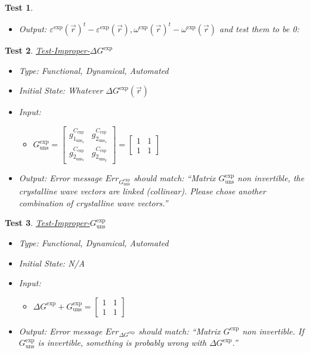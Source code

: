 \documentclass[12pt, titlepage]{article}
\newtheorem{Test}{Test}
\begin{document}
\begin{Test}
\begin{itemize}
\item Output:  ${\varepsilon^{\text{exp}}(\vec{r})}^{t}-\varepsilon^{\text{exp}}(\vec{r}), {\omega^{\text{exp}}(\vec{r})}^{t}- \omega^{\text{exp}}(\vec{r})$  and test them to be 0:
\end{itemize}
\end{Test}

\begin{Test}\normalfont\underline{Test-Improper-$\Delta G^{\text{exp}}$}
\label{T_Bad-G_ref}
\begin{itemize}
\item Type: Functional, Dynamical, Automated
\item Initial State: Whatever $\Delta G^{\text{exp}}(\vec{r})$
\item Input:
\begin{itemize}
	\item $G_{\text{uns}}^{\text{exp}} =
	\begin{bmatrix}
	g_{1_{{\text{uns}}_x}}^{C_{\text{exp}}} & g_{2_{{\text{uns}}_x}}^{C_{\text{exp}}} \\
	g_{2_{{\text{uns}}_x}}^{C_{\text{exp}}} & g_{2_{{\text{uns}}_y}}^{C_{\text{exp}}} 
	\end{bmatrix} =\begin{bmatrix}
	1 & 1 \\
	1 & 1 
	\end{bmatrix} $
	\end{itemize} 
\item Output:
Error message $Err_{G_{\text{uns}}^{\text{exp}}}$ should match:
\enquote{Matrix $G_{\text{uns}}^{\text{exp}}$ non invertible, the
  crystalline wave vectors are linked (collinear). Please chose
   another combination of crystalline wave vectors.}
\end{itemize}
\end{Test}

\begin{Test}\normalfont\underline{Test-Improper-$G_{\text{uns}}^{\text{exp}}$}
\label{T_Bad-Delta-G}
\begin{itemize}
\item Type: Functional, Dynamical, Automated
\item Initial State: N/A
\item Input:
\begin{itemize}
	\item $\Delta G^{\text{exp}}+G_{\text{uns}}^{\text{exp}} =
	\begin{bmatrix}
	1 & 1 \\
	1 & 1 
	\end{bmatrix} $
	\end{itemize} 
\item Output:
Error message $Err_{\Delta G^{\text{exp}}}$ should match: \enquote{Matrix $G^{\text{exp}}$ non invertible. If  $G_{\text{uns}}^{\text{exp}}$ is invertible, something is probably wrong with $\Delta G^{\text{exp}}$.}
\end{itemize}
\end{Test}
\end{document}

